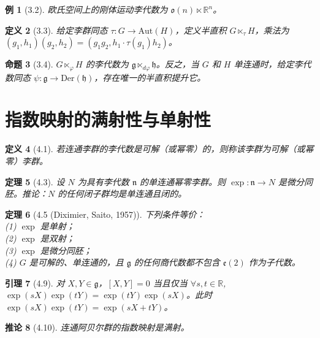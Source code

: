 \documentclass[12pt, a4paper]{ctexart}
\newtheorem{theorem}{定理}[section]
\newtheorem{proposition}[theorem]{命题}
\newtheorem{lemma}[theorem]{引理}
\newtheorem{corollary}[theorem]{推论}
\newtheorem{definition}[theorem]{定义}
\newtheorem{example}[theorem]{例}
\begin{document}
\begin{example}[3.2]
欧氏空间上的刚体运动李代数为 $\mathfrak{o}(n) \ltimes \mathbb{R}^n$。
\end{example}

\begin{definition}[3.3]
给定李群同态 $\tau: G \to \mathrm{Aut}(H)$，定义半直积 $G \ltimes_\tau H$，乘法为 $(g_1, h_1)(g_2, h_2) = (g_1 g_2, h_1 \cdot \tau(g_1)h_2)$。
\end{definition}

\begin{proposition}[3.4]
$G \ltimes_\varphi H$ 的李代数为 $\mathfrak{g} \ltimes_{d\varphi} \mathfrak{h}$。反之，当 $G$ 和 $H$ 单连通时，给定李代数同态 $\psi: \mathfrak{g} \to \mathrm{Der}(\mathfrak{h})$，存在唯一的半直积提升它。
\end{proposition}

\section{指数映射的满射性与单射性}

\begin{definition}[4.1]
若连通李群的李代数是可解（或幂零）的，则称该李群为可解（或幂零）李群。
\end{definition}

\begin{theorem}[4.3]
设 $N$ 为具有李代数 $\mathfrak{n}$ 的单连通幂零李群。则 $\exp: \mathfrak{n} \to N$ 是微分同胚。推论：$N$ 的任何闭子群均是单连通且闭的。
\end{theorem}

\begin{theorem}[4.5 (Diximier, Saito, 1957)]
下列条件等价：\\
(1) $\exp$ 是单射；\\
(2) $\exp$ 是双射；\\
(3) $\exp$ 是微分同胚；\\
(4) $G$ 是可解的、单连通的，且 $\mathfrak{g}$ 的任何商代数都不包含 $\mathfrak{e}(2)$ 作为子代数。
\end{theorem}

\begin{lemma}[4.9]
对 $X, Y \in \mathfrak{g}$，$[X, Y]=0$ 当且仅当 $\forall s, t \in \mathbb{R}$, $\exp(sX)\exp(tY) = \exp(tY)\exp(sX)$。此时 $\exp(sX)\exp(tY) = \exp(sX+tY)$。
\end{lemma}

\begin{corollary}[4.10]
连通阿贝尔群的指数映射是满射。
\end{corollary}
\end{document}
